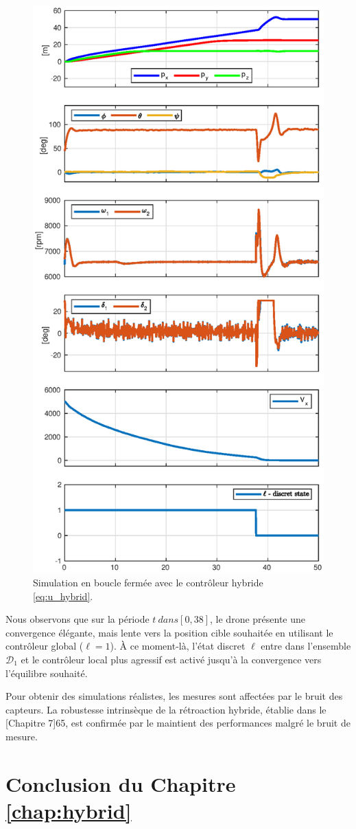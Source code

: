 \begin{figure}[!ht]
    \centering
    \includegraphics[trim=0cm 0cm 0cm 1.1cm,clip,width=0.8\columnwidth]{figures/switch_paper2.eps}
    \caption{Simulation en boucle fermée avec le contrôleur hybride \eqref{eq:u_hybrid}.}
    \label{fig_sim}
\end{figure}

Nous observons que sur la période $t \ dans \left[0,38\right]$, le drone
présente une convergence élégante, mais lente vers la position cible souhaitée en utilisant le contrôleur global ($\ell=1$). À ce moment-là, l'état discret $\ell$ entre dans l'ensemble $\mathcal{D}_1$ et le contrôleur local plus agressif est activé jusqu'à la convergence vers l'équilibre souhaité.

Pour obtenir des simulations réalistes, les mesures sont affectées par 
le bruit des capteurs. La robustesse intrinsèque de la rétroaction hybride, établie dans le [Chapitre 7]{65}, est confirmée par le maintient des performances malgré le bruit de mesure.

\section{Conclusion du Chapitre \ref{chap:hybrid}}





